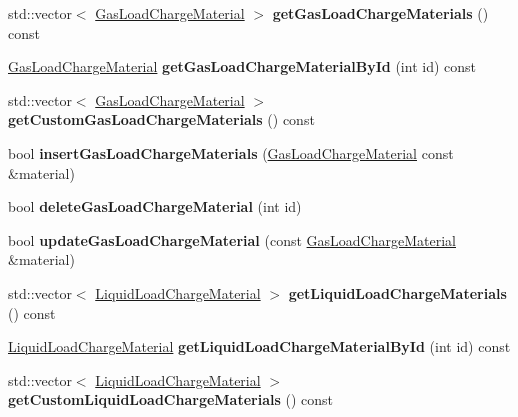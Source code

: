 \begin{DoxyCompactItemize}
std\+::vector$<$ \hyperlink{class_gas_load_charge_material}{Gas\+Load\+Charge\+Material} $>$ {\bfseries get\+Gas\+Load\+Charge\+Materials} () const
\item 
\mbox{\label{class_s_q_lite_ab89ac4049cbedcb6340f5d7d0139b89e}} 
\hyperlink{class_gas_load_charge_material}{Gas\+Load\+Charge\+Material} {\bfseries get\+Gas\+Load\+Charge\+Material\+By\+Id} (int id) const
\item 
\mbox{\label{class_s_q_lite_a1957d2f9ac35433b45e8511aa6889756}} 
std\+::vector$<$ \hyperlink{class_gas_load_charge_material}{Gas\+Load\+Charge\+Material} $>$ {\bfseries get\+Custom\+Gas\+Load\+Charge\+Materials} () const
\item 
\mbox{\label{class_s_q_lite_af482f51c0d3de08fbfa3e537382a567f}} 
bool {\bfseries insert\+Gas\+Load\+Charge\+Materials} (\hyperlink{class_gas_load_charge_material}{Gas\+Load\+Charge\+Material} const \&material)
\item 
\mbox{\label{class_s_q_lite_a3717a443c1151d717168d323ec6576c1}} 
bool {\bfseries delete\+Gas\+Load\+Charge\+Material} (int id)
\item 
\mbox{\label{class_s_q_lite_a21b8fbcd52ac37fe9e78df164ee8de25}} 
bool {\bfseries update\+Gas\+Load\+Charge\+Material} (const \hyperlink{class_gas_load_charge_material}{Gas\+Load\+Charge\+Material} \&material)
\item 
\mbox{\label{class_s_q_lite_a349f65213cc1b022293bc00ba0a4c3b5}} 
std\+::vector$<$ \hyperlink{class_liquid_load_charge_material}{Liquid\+Load\+Charge\+Material} $>$ {\bfseries get\+Liquid\+Load\+Charge\+Materials} () const
\item 
\mbox{\label{class_s_q_lite_a3f31756b0fc49be7123e7146cbb12c70}} 
\hyperlink{class_liquid_load_charge_material}{Liquid\+Load\+Charge\+Material} {\bfseries get\+Liquid\+Load\+Charge\+Material\+By\+Id} (int id) const
\item 
\mbox{\label{class_s_q_lite_a1a252d50bc2e861325f120a814fddd37}} 
std\+::vector$<$ \hyperlink{class_liquid_load_charge_material}{Liquid\+Load\+Charge\+Material} $>$ {\bfseries get\+Custom\+Liquid\+Load\+Charge\+Materials} () const

\end{DoxyCompactItemize}
